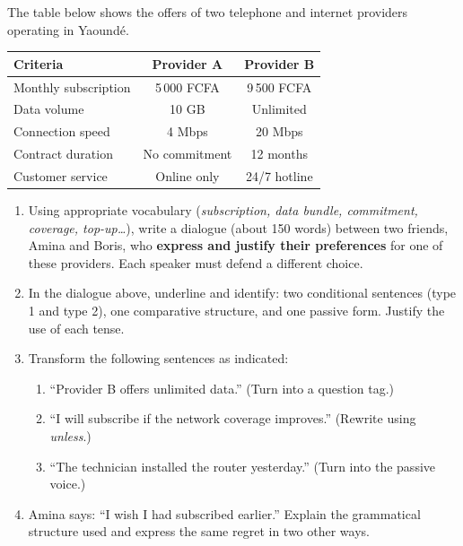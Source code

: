 \documentclass[11pt]{article}
\begin{document}
\begin{exercice}
The table below shows the offers of two telephone and internet providers operating in Yaoundé.

\begin{center}
\begin{tabular}{|l|c|c|}
\hline
\textbf{Criteria} & \textbf{Provider A} & \textbf{Provider B} \\
\hline
Monthly subscription & 5\,000 FCFA & 9\,500 FCFA \\
Data volume & 10 GB & Unlimited \\
Connection speed & 4 Mbps & 20 Mbps \\
Contract duration & No commitment & 12 months \\
Customer service & Online only & 24/7 hotline \\
\hline
\end{tabular}
\end{center}

\begin{enumerate}
\item Using appropriate vocabulary (\textit{subscription, data bundle, commitment, coverage, top-up\ldots}), write a dialogue (about 150 words) between two friends, Amina and Boris, who \textbf{express and justify their preferences} for one of these providers. Each speaker must defend a different choice.
\item In the dialogue above, underline and identify: two conditional sentences (type 1 and type 2), one comparative structure, and one passive form. Justify the use of each tense.
\item Transform the following sentences as indicated:
\begin{enumerate}
\item ``Provider B offers unlimited data.'' (Turn into a question tag.)
\item ``I will subscribe if the network coverage improves.'' (Rewrite using \textit{unless}.)
\item ``The technician installed the router yesterday.'' (Turn into the passive voice.)
\end{enumerate}
\item Amina says: ``I wish I had subscribed earlier.'' Explain the grammatical structure used and express the same regret in two other ways.
\end{enumerate}
\end{exercice}
\end{document}

